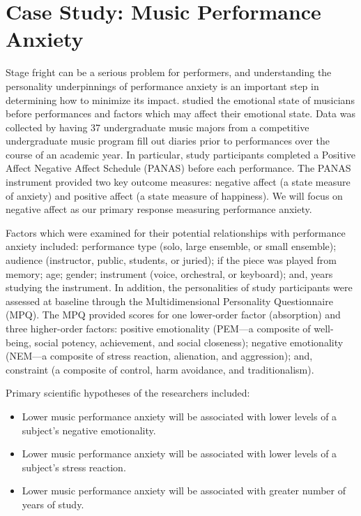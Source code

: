 \documentclass[
]{krantz}
\providecommand{\tightlist}{%
  \setlength{\itemsep}{0pt}\setlength{\parskip}{0pt}}
\begin{document}
\hypertarget{cs:music}{%
\section{Case Study: Music Performance Anxiety}\label{cs:music}}

Stage fright can be a serious problem for performers, and understanding the personality underpinnings of performance anxiety is an important step in determining how to minimize its impact. \citet{Miller2010} studied the emotional state of musicians before performances and factors which may affect their emotional state. Data was collected by having 37 undergraduate music majors from a competitive undergraduate music program fill out diaries prior to performances over the course of an academic year. In particular, study participants completed a Positive Affect Negative Affect Schedule (PANAS) before each performance. The PANAS instrument provided two key outcome measures: negative affect (a state measure of anxiety) and positive affect (a state measure of happiness). We will focus on negative affect as our primary response measuring performance anxiety.

Factors which were examined for their potential relationships with performance anxiety included: performance type (solo, large ensemble, or small ensemble); audience (instructor, public, students, or juried); if the piece was played from memory; age; gender; instrument (voice, orchestral, or keyboard); and, years studying the instrument. In addition, the personalities of study participants were assessed at baseline through the Multidimensional Personality Questionnaire (MPQ). The MPQ provided scores for one lower-order factor (absorption) and three higher-order factors: positive emotionality (PEM---a composite of well-being, social potency, achievement, and social closeness); negative emotionality (NEM---a composite of stress reaction, alienation, and aggression); and, constraint (a composite of control, harm avoidance, and traditionalism).

Primary scientific hypotheses of the researchers included:

\begin{itemize}
\tightlist
\item
  Lower music performance anxiety will be associated with lower levels of a subject's negative emotionality.
\item
  Lower music performance anxiety will be associated with lower levels of a subject's stress reaction.
\item
  Lower music performance anxiety will be associated with greater number of years of study.
\end{itemize}
\end{document}
